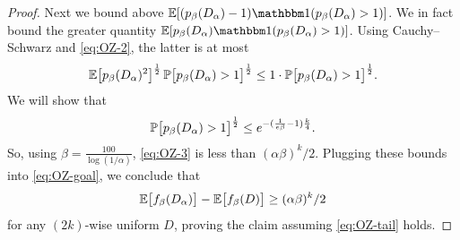 \documentclass[10pt,a4paper]{article}
\theoremstyle{definition}
\renewcommand{\Pr}{\mathop{\mathbb{P}\/}}
\newcommand{\E}{\mathop{\mathbb{E}\/}}
\newcommand{\bbone}{\mathbbm 1}
\newcommand{\Id}{\bbone}
\begin{document}
\begin{proof}
    Next we bound above $\E[(p_\beta(D_\alpha)-1) \Id(p_\beta(D_\alpha) > 1)]$.  We in fact bound the greater quantity $\E[p_\beta(D_\alpha) \Id(p_\beta(D_\alpha) > 1)]$.
    Using Cauchy--Schwarz and \cref{eq:OZ-2}, the latter is at most
    \begin{align} \label{eq:OZ-3}
      \E\bigl[p_\beta(D_\alpha)^2\bigr]^{\frac{1}{2}} \Pr\bigl[p_\beta(D_\alpha) > 1\bigr]^{\frac{1}{2}}
      \le 1 \cdot \Pr\bigl[p_\beta(D_\alpha) > 1\bigr]^{\frac{1}{2}} .
    \end{align}
    We will show that 
    \begin{align} \label{eq:OZ-tail}
      \Pr\bigl[p_\beta(D_\alpha) > 1\bigr]^{\frac{1}{2}}
      \le e^{-(\frac{1}{e\beta} - 1)\frac{k}{4}} .
    \end{align}
    So, using $\beta = \frac{100}{\log(1/\alpha)}$, \cref{eq:OZ-3} is less than $(\alpha \beta)^k/2$.
    Plugging these bounds into \cref{eq:OZ-goal}, we conclude that
    \[
      \E\bigl[f_\beta(D_\alpha)\bigr] - \E\bigl[f_\beta(D)\bigr]
      \ge (\alpha \beta)^k/2
    \]
    for any $(2k)$-wise uniform $D$, proving the claim assuming \cref{eq:OZ-tail} holds.

    \medskip


\end{proof}
\end{document}
